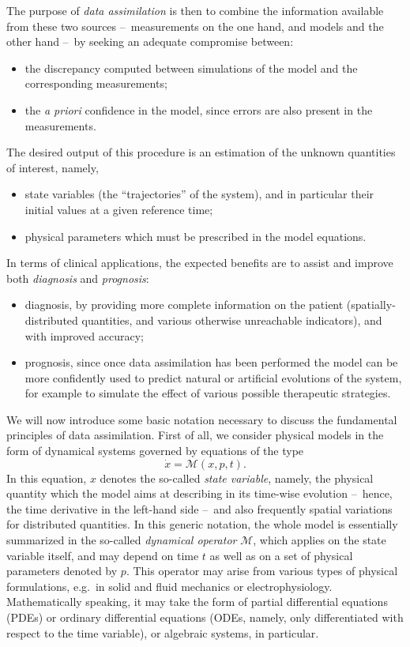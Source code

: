 The purpose of \emph{data assimilation} is then to combine the information available from these two sources --~measurements on the one hand, and models and the other hand --~by seeking an adequate compromise between:
\begin{itemize}
	\item the discrepancy computed between simulations of the model and the corresponding measurements;
	\item the \emph{a priori} confidence in the model, since errors are also present in the measurements.
\end{itemize}
The desired output of this procedure is an estimation of the unknown quantities of interest, namely,
\begin{itemize}
	\item state variables (the ``trajectories'' of the system), and in particular their initial values at a given reference time;
	\item physical parameters which must be prescribed in the model equations.
\end{itemize}
In terms of clinical applications, the expected benefits are to assist and improve both \emph{diagnosis} and \emph{prognosis}:
\begin{itemize}
	\item diagnosis, by providing more complete information on the patient (spatially-distributed quantities, and various otherwise unreachable indicators), and with improved accuracy;
	\item prognosis, since once data assimilation has been performed the model can be more confidently used to predict natural or artificial evolutions of the system, for example to simulate the effect of various possible therapeutic strategies.
\end{itemize}

We will now introduce some basic notation necessary to discuss the fundamental principles of data assimilation. First of all, we consider physical models in the form of dynamical systems governed by equations of the type
\begin{equation}\label{eq:modelNotation}
	\dot{x} = \mathcal{M}(x,p,t).
\end{equation}
In this equation, $x$ denotes the so-called \emph{state variable}, namely, the physical quantity which the model aims at describing in its time-wise evolution --~hence, the time derivative in the left-hand side --~and also frequently spatial variations for distributed quantities. In this generic notation, the whole model is essentially summarized in the so-called \emph{dynamical operator} $\mathcal{M}$, which applies on the state variable itself, and may depend on time $t$ as well as on a set of physical parameters denoted by $p$. This operator may arise from various types of physical formulations, e.g.~in solid and fluid mechanics or electrophysiology. Mathematically speaking, it may take the form of partial differential equations (PDEs) or ordinary differential equations (ODEs, namely, only differentiated with respect to the time variable), or algebraic systems, in particular.


